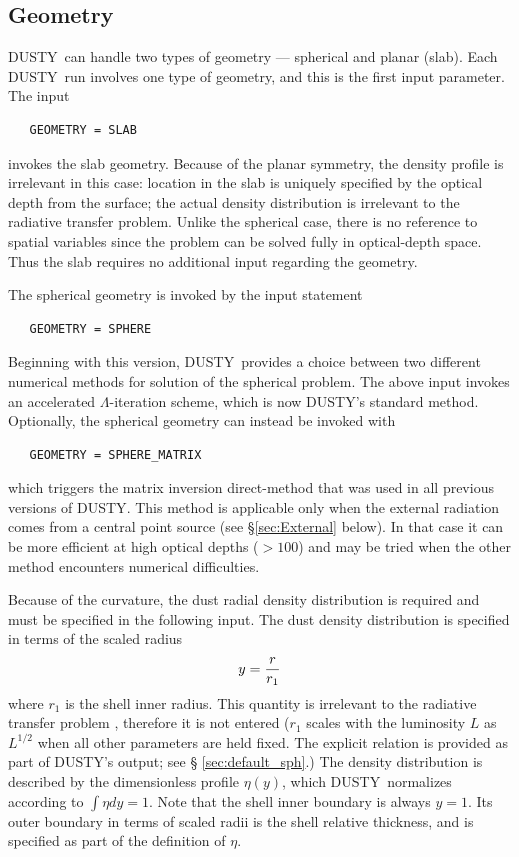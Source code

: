 \documentclass[11pt]{article}
\def\D    {{\sf DUSTY}}
\begin{document}
\subsection{Geometry}
\label{geometry}

\D\ can handle two types of geometry --- spherical and planar
(slab). Each \D\ run involves one type of geometry, and this is the
first input parameter. The input
\begin{verbatim}
   GEOMETRY = SLAB
\end{verbatim}
invokes the slab geometry. Because of the planar symmetry, the density
profile is irrelevant in this case: location in the slab is uniquely
specified by the optical depth from the surface; the actual density
distribution is irrelevant to the radiative transfer problem. Unlike
the spherical case, there is no reference to spatial variables since
the problem can be solved fully in optical-depth space. Thus the slab
requires no additional input regarding the geometry.

\medskip

The spherical geometry is invoked by the input statement
\begin{verbatim}
   GEOMETRY = SPHERE
\end{verbatim}
Beginning with this version, \D\ provides a choice between two different
numerical methods for solution of the spherical problem. The above input
invokes an accelerated $\Lambda$-iteration scheme, which is now \D's standard
method. Optionally, the spherical geometry can instead be invoked with
\begin{verbatim}
   GEOMETRY = SPHERE_MATRIX
\end{verbatim}
which triggers the matrix inversion direct-method \cite{Schmid} that
was used in all previous versions of \D. This method is applicable
only when the external radiation comes from a central point source
(see \S\ref{sec:External} below). In that case it can be more
efficient at high optical depths ($> 100$) and may be tried when the
other method encounters numerical difficulties.

Because of the curvature, the dust radial density distribution is
required and must be specified in the following input. The dust
density distribution is specified in terms of the scaled radius
\[
y = {r \over r_1}
\]
where $r_1$ is the shell inner radius.  This quantity is irrelevant to the
radiative transfer problem \cite{IE97}, therefore it is not entered ($r_1$
scales with the luminosity $L$ as $L^{1/2}$ when all other parameters are held
fixed. The explicit relation is provided as part of \D's output; see \S
\ref{sec:default_sph}.) The density distribution is described by the
dimensionless profile $\eta(y)$, which \D\ normalizes according to $\int\eta
dy = 1$. Note that the shell inner boundary is always $y = 1$.  Its outer
boundary in terms of scaled radii is the shell relative thickness, and is
specified as part of the definition of $\eta$.
\end{document}
